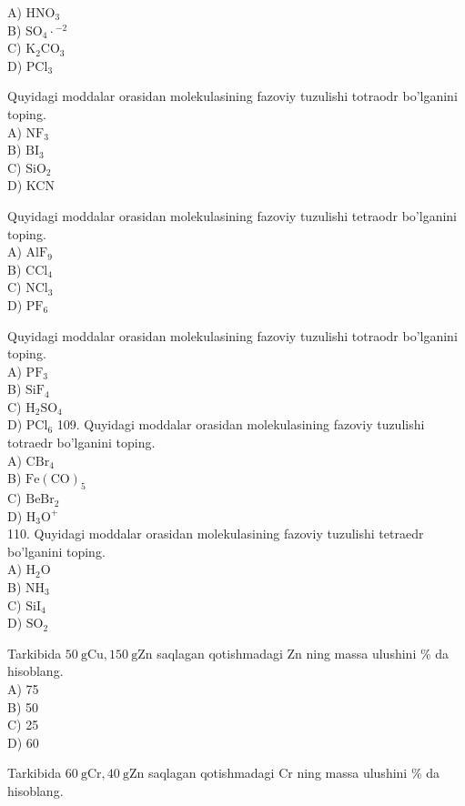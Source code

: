 A) $\mathrm{HNO}_{3}$\\
B) $\mathrm{SO}_{4} \cdot{ }^{-2}$\\
C) $\mathrm{K}_{2} \mathrm{CO}_{3}$\\
D) $\mathrm{PCl}_{3}$
  \item Quyidagi moddalar orasidan molekulasining fazoviy tuzulishi totraodr bo'lganini toping.\\
A) $\mathrm{NF}_{3}$\\
B) $\mathrm{BI}_{3}$\\
C) $\mathrm{SiO}_{2}$\\
D) KCN
  \item Quyidagi moddalar orasidan molekulasining fazoviy tuzulishi tetraodr bo'lganini toping.\\
A) $\mathrm{AlF}_{9}$\\
B) $\mathrm{CCl}_{4}$\\
C) $\mathrm{NCl}_{3}$\\
D) $\mathrm{PF}_{6}$
  \item Quyidagi moddalar orasidan molekulasining fazoviy tuzulishi totraodr bo'lganini toping.\\
A) $\mathrm{PF}_{3}$\\
B) $\mathrm{SiF}_{4}$\\
C) $\mathrm{H}_{2} \mathrm{SO}_{4}$\\
D) $\mathrm{PCl}_{6}$
109. Quyidagi moddalar orasidan molekulasining fazoviy tuzulishi totraedr bo'lganini toping.\\
A) $\mathrm{CBr}_{4}$\\
B) $\mathrm{Fe}(\mathrm{CO})_{5}$\\
C) $\mathrm{BeBr}_{2}$\\
D) $\mathrm{H}_{3} \mathrm{O}^{+}$\\
110. Quyidagi moddalar orasidan molekulasining fazoviy tuzulishi tetraedr bo'lganini toping.\\
A) $\mathrm{H}_{2} \mathrm{O}$\\
B) $\mathrm{NH}_{3}$\\
C) $\mathrm{SiI}_{4}$\\
D) $\mathrm{SO}_{2}$
  \item Tarkibida $50 \mathrm{~g} \mathrm{Cu}, 150 \mathrm{~g} \mathrm{Zn}$ saqlagan qotishmadagi Zn ning massa ulushini \% da hisoblang.\\
A) 75\\
B) 50\\
C) 25\\
D) 60
  \item Tarkibida $60 \mathrm{~g} \mathrm{Cr}, 40 \mathrm{~g} \mathrm{Zn}$ saqlagan qotishmadagi Cr ning massa ulushini \% da hisoblang.\\
